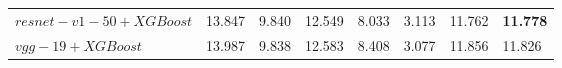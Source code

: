 \documentclass[10pt,aspectratio=43]{beamer}
\begin{document}
\begin{frame}
\begin{table}
{\begin{tabular}{llllllll}
      $resnet-v1-50+XGBoost$ &13.847  &9.840 & 12.549  & 8.033  & 3.113 &11.762 &\textbf{11.778}     \\
      $vgg-19+XGBoost$ &13.987  &9.838 & 12.583 &8.408  &3.077 &11.856 &11.826     \\

      \bottomrule
    \end{tabular}
  }
\end{table}
\end{frame}
\end{document}
